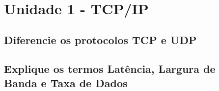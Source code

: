 \section{Unidade 1 - TCP/IP}
\subsection{Diferencie os protocolos TCP e UDP}

\subsection{Explique os termos Latência, Largura de Banda e Taxa de Dados}